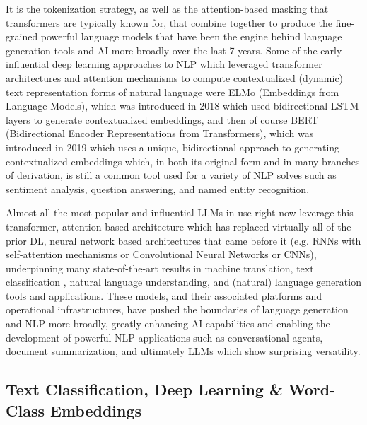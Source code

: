 \documentclass[final]{clv2025}
\begin{document}
It is the tokenization strategy, as well as the attention-based masking that transformers are typically known for, that combine together to produce the fine-grained powerful language models that have been the engine behind language generation tools and AI more broadly over the last 7 years. Some of the early influential deep learning approaches to NLP which leveraged transformer architectures and attention mechanisms to compute contextualized (dynamic) text representation forms of natural language were ELMo (Embeddings from Language Models), which was introduced in 2018 \cite{peters2018deep} which used bidirectional LSTM layers to generate contextualized embeddings, and then of course BERT (Bidirectional Encoder Representations from Transformers), which was introduced in 2019 \cite{devlin-etal-2019-bert} which uses a unique, bidirectional approach to generating contextualized embeddings which, in both its original form and in many branches of derivation, is still a common tool used for a variety of NLP solves such as sentiment analysis, question answering, and named entity recognition. 

Almost all the most popular and influential LLMs in use right now leverage this transformer, attention-based architecture which has replaced virtually all of the prior DL, neural network based architectures that came before it (e.g. RNNs with self-attention mechanisms or Convolutional Neural Networks or CNNs), underpinning many state-of-the-art results in machine translation, text classification \cite{devlin-etal-2019-bert}, natural language understanding, and (natural) language generation tools \cite{radford2019language} and applications. These models, and their associated platforms and operational infrastructures, have pushed the boundaries of language generation and NLP more broadly, greatly enhancing AI capabilities and enabling the development of powerful NLP applications such as conversational agents, document summarization, and ultimately LLMs which show surprising versatility.

\subsection{Text Classification, Deep Learning \& Word-Class Embeddings}
\end{document}
